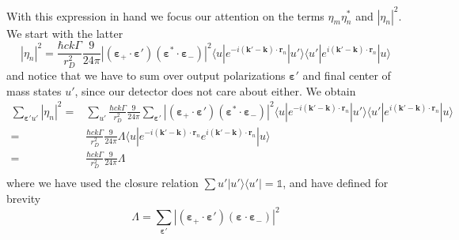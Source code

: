 \documentclass[11pt,letter]{article}
\newcommand{\bv}[1]{\ensuremath{\bm{#1}}}
\begin{document}
With this expression in hand we focus our attention on the terms
$\eta_{m}\eta_{n}^{*}$ and $|\eta_{n}|^{2}$.  We start with the latter 
\begin{equation}
 |\eta_{n}|^{2} =  \frac{\hbar c k \Gamma}{r_{D}^{2}}  
    \frac{9}{24\pi} 
       | (\bv{\varepsilon}_{+}\cdot \bv{\varepsilon}' )
                       (\bv{\varepsilon}^{*}\cdot \bv{\varepsilon}_{-} ) |^{2}
      \langle u | e^{-i(\bv{k}'-\bv{k}) \cdot\bv{r}_{n}} | u'  \rangle
      \langle u' | e^{i(\bv{k}'-\bv{k}) \cdot\bv{r}_{n}} | u  \rangle
\end{equation}
and notice that we have to sum over output polarizations $\bv{\varepsilon}'$
and final center of mass states  $u'$, since our detector does not care about
either. We obtain 
\begin{equation}
\begin{split}
 \sum_{\bv{\varepsilon}' u'}|\eta_{n}|^{2} = & 
    \sum_{ u'} \frac{\hbar c k \Gamma}{r_{D}^{2}}  
    \frac{9}{24\pi} 
      \sum_{\bv{\varepsilon}'} | (\bv{\varepsilon}_{+}\cdot \bv{\varepsilon}' )
                       (\bv{\varepsilon}^{*}\cdot \bv{\varepsilon}_{-} ) |^{2}
      \langle u | e^{-i(\bv{k}'-\bv{k}) \cdot\bv{r}_{n}} | u'  \rangle
      \langle u' | e^{i(\bv{k}'-\bv{k}) \cdot\bv{r}_{n}} | u  \rangle \\
 = & \frac{\hbar c k \Gamma}{r_{D}^{2}}  
    \frac{9}{24\pi} \Lambda 
      \langle u | e^{-i(\bv{k}'-\bv{k}) \cdot\bv{r}_{n}}  e^{i(\bv{k}'-\bv{k}) 
      \cdot\bv{r}_{n}} | u  \rangle \\
 = & \frac{\hbar c k \Gamma}{r_{D}^{2}}  
    \frac{9}{24\pi} \Lambda \\ 
\end{split}
\end{equation}
where we have used the closure relation $\sum{u'}|u'\rangle\langle u'| =
\mathbb{1}$, and have defined for brevity 
\begin{equation}
 \Lambda = 
  \sum_{\bv{\varepsilon}' }
        | (\bv{\varepsilon}_{+}\cdot \bv{\varepsilon}' )
                        (\bv{\varepsilon}\cdot \bv{\varepsilon}_{-} ) |^{2} 
\end{equation} 
\end{document}
